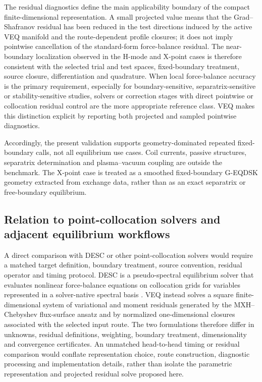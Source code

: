 \documentclass[final, 3p, times]{elsarticle}
\begin{document}
The residual diagnostics define the main applicability boundary of the compact finite-dimensional representation. A small projected value means that the Grad--Shafranov residual has been reduced in the test directions induced by the active VEQ manifold and the route-dependent profile closures; it does not imply pointwise cancellation of the standard-form force-balance residual. The near-boundary localization observed in the H-mode and X-point cases is therefore consistent with the selected trial and test spaces, fixed-boundary treatment, source closure, differentiation and quadrature. When local force-balance accuracy is the primary requirement, especially for boundary-sensitive, separatrix-sensitive or stability-sensitive studies, solvers or correction stages with direct pointwise or collocation residual control are the more appropriate reference class. VEQ makes this distinction explicit by reporting both projected and sampled pointwise diagnostics.

Accordingly, the present validation supports geometry-dominated repeated fixed-boundary calls, not all equilibrium use cases. Coil currents, passive structures, separatrix determination and plasma--vacuum coupling are outside the benchmark. The X-point case is treated as a smoothed fixed-boundary G-EQDSK geometry extracted from exchange data, rather than as an exact separatrix or free-boundary equilibrium.

\subsection{Relation to point-collocation solvers and adjacent equilibrium workflows}
\label{sec:desc-relation}

A direct comparison with DESC or other point-collocation solvers would require a matched target definition, boundary treatment, source convention, residual operator and timing protocol. DESC is a pseudo-spectral equilibrium solver that evaluates nonlinear force-balance equations on collocation grids for variables represented in a solver-native spectral basis \cite{Dudt2020}. VEQ instead solves a square finite-dimensional system of variational and moment residuals generated by the MXH--Chebyshev flux-surface ansatz and by normalized one-dimensional closures associated with the selected input route. The two formulations therefore differ in unknowns, residual definitions, weighting, boundary treatment, dimensionality and convergence certificates. An unmatched head-to-head timing or residual comparison would conflate representation choice, route construction, diagnostic processing and implementation details, rather than isolate the parametric representation and projected residual solve proposed here.
\end{document}

